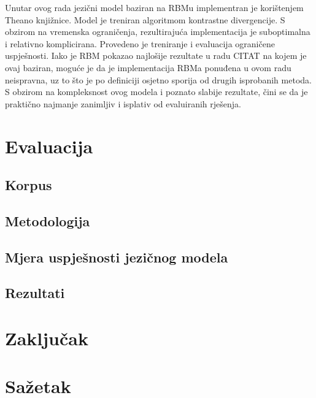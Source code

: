 \documentclass[times, utf8, diplomski, numeric]{fer}
\begin{document}
Unutar ovog rada jezični model baziran na RBMu implementran je korištenjem Theano knjižnice. Model je treniran algoritmom kontrastne divergencije. S obzirom na vremenska ograničenja, rezultirajuća implementacija je suboptimalna i relativno komplicirana. Provedeno je treniranje i evaluacija ograničene uspješnosti. Iako je RBM pokazao najlošije rezultate u radu CITAT na kojem je ovaj baziran, moguće je da je implementacija RBMa ponuđena u ovom radu neispravna, uz to što je po definiciji osjetno sporija od drugih isprobanih metoda. S obzirom na kompleksnost ovog modela i poznato slabije rezultate, čini se da je praktično najmanje zanimljiv i isplativ od evaluiranih rješenja.

\chapter{Evaluacija}

\section{Korpus}

\section{Metodologija}

\section{Mjera uspješnosti jezičnog modela}

\section{Rezultati}

\chapter{Zaključak} 




\chapter{Sažetak}
\end{document}
